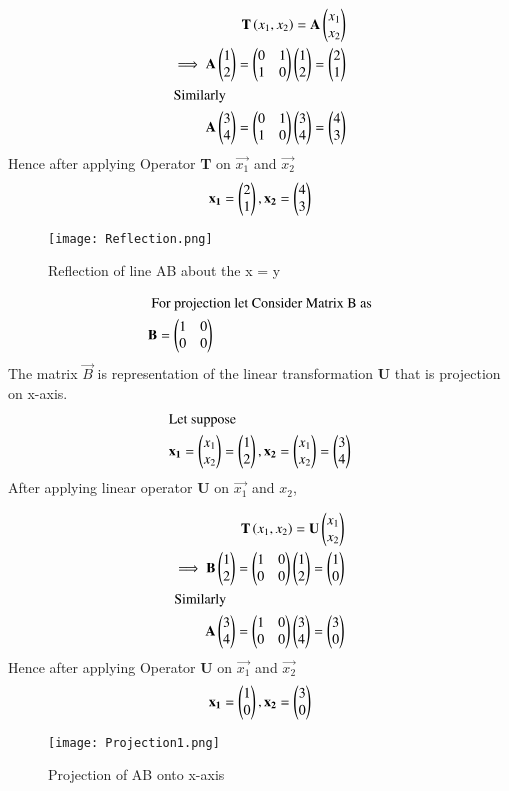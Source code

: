 \documentclass[journal,12pt,twocolumn]{IEEEtran}
\begin{document}
\begin{align}
\textbf{T}\left(x_1, x_2\right) = \mathbf{A}\begin{pmatrix} x_1  \\ x_2\end{pmatrix}\\
\implies   \mathbf{A}\begin{pmatrix}1 \\ 2\end{pmatrix} =  \begin{pmatrix}0 & 1 \\ 1 & 0 \end{pmatrix} \begin{pmatrix}1 \\ 2\end{pmatrix} = \begin{pmatrix}2 \\ 1\end{pmatrix}\\
\intertext{Similarly}
  \mathbf{A}\begin{pmatrix}3 \\ 4\end{pmatrix} =  \begin{pmatrix}0 & 1 \\ 1 & 0 \end{pmatrix} \begin{pmatrix}3 \\ 4\end{pmatrix} = \begin{pmatrix}4 \\ 3\end{pmatrix}
  \end{align}
  Hence after  applying Operator \textbf{T} on $\vec{x_1}$ and $\vec{x_2}$
  \begin{align}
  \mathbf{x_1} = \begin{pmatrix}2\\1\end{pmatrix}, \mathbf{x_2} =\begin{pmatrix}4\\3\end{pmatrix}
\end{align}
\begin{figure}[htb!]	
	\centering	
	\texttt{[image: Reflection.png]}	
	\caption{Reflection of line AB about the  x = y}
	\label{fig1}	
\end{figure}

\begin{align}
\intertext{ For projection let Consider Matrix B as} \mathbf{B} = \begin{pmatrix}1 & 0 \\ 0 & 0 \end{pmatrix} 
\end{align}
The matrix  $\vec{B}$ is representation  of the linear transformation \textbf{U} that is projection on x-axis.
\begin{align}
\intertext{Let suppose}\mathbf{x_1} =\begin{pmatrix}x_1 \\ x_2\end{pmatrix} = \begin{pmatrix}1 \\ 2\end{pmatrix},\mathbf{x_2} =\begin{pmatrix}x_1 \\ x_2\end{pmatrix} =\begin{pmatrix}3 \\ 4\end{pmatrix} 
\end{align}
After applying linear operator \textbf{U} on $\vec{x_1}$ and $x_2$,

\begin{align}
\textbf{T}\left(x_1, x_2\right) = \mathbf{U}\begin{pmatrix} x_1  \\ x_2\end{pmatrix}\\
\implies   \mathbf{B}\begin{pmatrix}1 \\ 2\end{pmatrix} =  \begin{pmatrix}1 & 0 \\ 0 & 0 \end{pmatrix} \begin{pmatrix}1 \\ 2\end{pmatrix} = \begin{pmatrix}1 \\ 0\end{pmatrix}\\
\intertext{Similarly}
\mathbf{A}\begin{pmatrix}3 \\ 4\end{pmatrix} =  \begin{pmatrix}1 & 0 \\ 0 & 0 \end{pmatrix} \begin{pmatrix}3 \\ 4\end{pmatrix} = \begin{pmatrix}3 \\ 0\end{pmatrix}
\end{align}
Hence after  applying Operator \textbf{U} on $\vec{x_1}$ and $\vec{x_2}$
\begin{align}
\mathbf{x_1} = \begin{pmatrix}1\\0\end{pmatrix}, \mathbf{x_2} =\begin{pmatrix}3\\0\end{pmatrix}
\end{align}

\begin{figure}[htb!]	
	\centering	
	\texttt{[image: Projection1.png]}	
	\caption{Projection of AB onto x-axis}
	\label{fig2}	
\end{figure}
\end{document}
